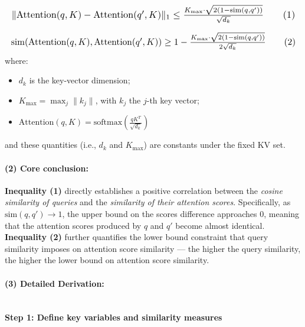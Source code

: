 \documentclass[11pt]{article}
\begin{document}
\begin{equation}
\resizebox{\columnwidth}{!}{$
\lVert \text{Attention}(q, K) - \text{Attention}(q', K) \rVert_1
\le
\frac{
K_{\text{max}} \cdot \sqrt{2(1 - \text{sim}(q, q'))}
}{
\sqrt{d_k}
}
\tag{1}
$}
\end{equation}

\begin{equation}
\resizebox{\columnwidth}{!}{$
\text{sim}(\text{Attention}(q, K), \text{Attention}(q', K)) \ge 1 - \frac{
K_{\text{max}} \cdot \sqrt{2(1 - \text{sim}(q, q'))}
}{
2 \sqrt{d_k}
}
\tag{2}
$}
\end{equation}
where:
\begin{itemize}
    \item $d_k$ is the key-vector dimension;
    \item $K_{\text{max}} = \max_j \|k_j\|$, with $k_j$ the $j$-th key vector;
    \item $\text{Attention}(q, K) = \text{softmax}\left(\frac{qK^T}{\sqrt{d_k}}\right) $
\end{itemize}
and these quantities (i.e., $d_k$ and $K_{\text{max}}$) are constants under the fixed KV set.



\paragraph{(2) Core conclusion:}
\textbf{Inequality (1)} directly establishes a positive correlation between the \textit{cosine similarity of queries} and the \textit{similarity of their attention scores}. Specifically, as $\text{sim}(q, q') \to 1$, the upper bound on the scores difference approaches $0$, meaning that the attention scores produced by $q$ and $q'$ become almost identical. \textbf{Inequality (2)} further quantifies the lower bound constraint that query similarity imposes on attention score similarity — the higher the query similarity, the higher the lower bound on attention score similarity.

\paragraph{(3) Detailed Derivation:} \mbox{} \\


\textbf{Step 1: Define key variables and similarity measures}
\end{document}
